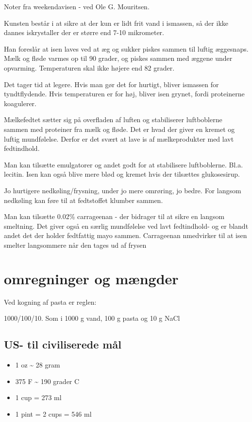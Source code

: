 \documentclass[
]{book}
\providecommand{\tightlist}{%
  \setlength{\itemsep}{0pt}\setlength{\parskip}{0pt}}
\begin{document}
Noter fra weekendavisen - ved Ole G. Mouritsen.

Kunsten består i at sikre at der kun er lidt frit vand i ismassen,
så der ikke dannes iskrystaller der er større end 7-10 mikrometer.

Han foreslår at isen laves ved at æg og sukker piskes sammen til luftig æggesnaps. Mælk og fløde varmes op til 90 grader, og piskes sammen med æggene under opvarming. Temperaturen skal ikke højere end 82 grader.

Det tager tid at legere. Hvis man gør det for hurtigt, bliver
ismassen for tyndtflydende. Hvis temperaturen er for høj, bliver isen grynet, fordi proteinerne koagulerer.

Mælkefedtet sætter sig på overfladen af luften og stabiliserer luftboblerne sammen med proteiner fra mælk og fløde. Det er hvad der giver en kremet og
luftig mundfølelse. Derfor er det svært at lave is af mælkeprodukter med lavt fedtindhold.

Man kan tilsætte emulgatorer og andet godt for at stabilisere
luftboblerne. Bl.a. lecitin. Isen kan også blive mere blød og kremet hvis der tilsættes glukosesirup.

Jo hurtigere nedkøling/frysning, under jo mere omrøring, jo bedre.
For langsom nedkøling kan føre til at fedtstoffet klumber sammen.

Man kan tilsætte 0.02\% carrageenan - der bidrager til at sikre en langsom smeltning. Det giver også en særlig mundfølelse ved lavt fedtindhold- og er blandt andet det der holder fedtfattig mayo sammen. Carrageenan nmedvirker til at isen smelter langsommere når den tages ud af frysen

\hypertarget{omregninger-og-muxe6ngder}{%
\chapter{omregninger og mængder}\label{omregninger-og-muxe6ngder}}

Ved kogning af pasta er reglen:

1000/100/10. Som i 1000 g vand, 100 g pasta og 10 g NaCl

\hypertarget{us--til-civiliserede-muxe5l}{%
\section{US- til civiliserede mål}\label{us--til-civiliserede-muxe5l}}

\begin{itemize}
\tightlist
\item
  1 oz \textasciitilde{} 28 gram
\item
  375 F \textasciitilde{} 190 grader C
\item
  1 cup = 273 ml
\item
  1 pint = 2 cups = 546 ml
\end{itemize}
\end{document}
